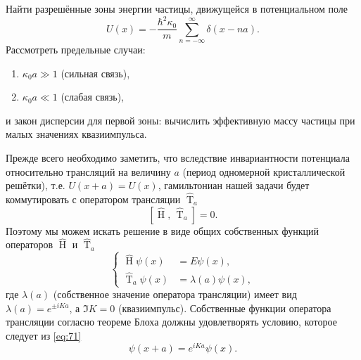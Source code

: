 \documentclass[a4paper]{article}
\begin{document}
\begin{problem}
Найти разрешённые зоны энергии частицы, движущейся в потенциальном
поле
\[
	U(x)= - \frac{\hbar^2 \kappa_0}{m} \sum_{n=-\infty}^{\infty} \delta(x-na)
.\] 
Рассмотреть предельные случаи:
\renewcommand{\labelenumi}{\asbuk{enumi})}
\begin{enumerate}
	\item $\kappa_0 a\gg 1$ (сильная связь),
	\item $\kappa_0 a \ll 1$ (слабая связь),
\end{enumerate}
и закон дисперсии для первой зоны: вычислить эффективную массу
частицы при малых значениях квазиимпульса.
\end{problem}
\begin{sol}
Прежде всего необходимо заметить, что вследствие инвариантности
потенциала относительно трансляций на величину $a$ (период
одномерной кристаллической решётки), т.\:е. $U(x+a)=U(x)$,
гамильтониан нашей задачи будет коммутировать с оператором
трансляции $\widehat{\operatorname{T}}_a$ 
\[
	[\widehat{\operatorname{H}},\,\widehat{\operatorname{T}}_a]=0
.\] 
Поэтому мы можем искать решение в виде общих собственных функций
операторов $\widehat{\operatorname{H}}$ и $\widehat{\operatorname{T}}_a$ 
\begin{equation}
\left\{
\begin{aligned}
	\widehat{\operatorname{H}} \psi(x) &= E \psi (x),\\
	\widehat{\operatorname{T}}_a \psi (x)&= \lambda (a)
	\psi(x),
\end{aligned}
\right.
\label{eq:71}
\end{equation} 
где $\lambda (a)$ (собственное значение оператора трансляции)
имеет вид $\lambda (a)= e^{\pm i Ka}$, а $\Im K=0$ (квазиимпульс).
Собственные функции оператора трансляции согласно теореме Блоха
должны удовлетворять условию, которое следует из  \eqref{eq:71}
\begin{equation}
	\psi(x+a)=e^{i Ka}\psi(x)
	\label{eq:72}
.\end{equation}


\end{sol}
\end{document}
